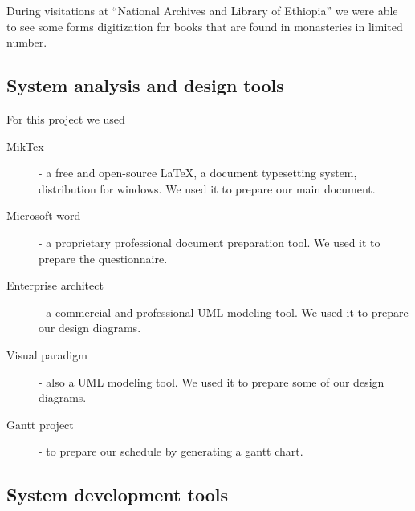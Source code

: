 During visitations at ``National Archives and Library of Ethiopia'' we were able to see some forms digitization for books that are found in monasteries in limited number.

		\subsection{System analysis and design tools}

For this project we used 

\begin{description}
	\item[MikTex] - a free and open-source \LaTeX, a document typesetting system, distribution for windows. We used it to prepare our main document.
   \item[Microsoft word] - a proprietary professional document preparation tool. We used it to prepare the questionnaire.
	\item[Enterprise architect] - a commercial and professional UML modeling tool. We used it to prepare our design diagrams.
	\item[Visual paradigm] - also a UML modeling tool. We used it to prepare some of our design diagrams.
	\item[Gantt project] - to prepare our schedule by generating a gantt chart.
\end{description}

		\subsection{System development tools}

